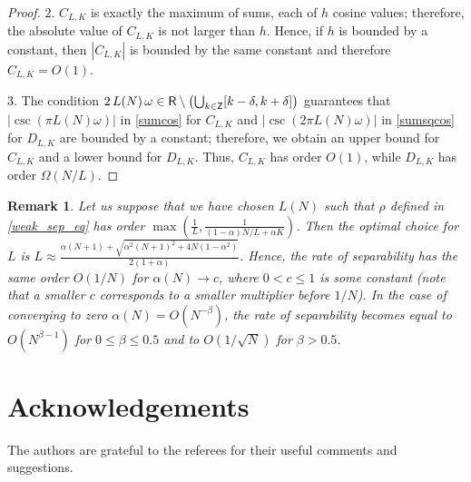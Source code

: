 \documentclass[sii]{ipart}
\newtheorem{remark}{Remark}
\begin{document}
\begin{proof}
    2. $C_{L,K}$ is exactly the maximum of sums, each of $h$ cosine values; therefore, the absolute value of $C_{L,K}$ is not larger than $h$. Hence, if $h$ is bounded by a constant, then $|C_{L,K}|$ is bounded by the same constant and therefore $C_{L,K} = O(1)$.

    3. The condition $2\, L(N)\, \omega \in  \mathsf{R} \setminus \left(\bigcup_{k \in \mathsf{Z}} [k - \delta, k + \delta] \right)$ guarantees that  $|\csc(\pi L(N) \omega)|$ in \eqref{sumcos} for $C_{L,K}$ and $|\csc(2 \pi L(N) \omega)|$ in \eqref{sumsqcos} for $D_{L,K}$ are bounded by a constant; therefore, we obtain an upper bound for $C_{L,K}$ and a lower bound for $D_{L,K}$. Thus, $C_{L, K}$ has order $O(1)$, while $D_{L, K}$ has order $\Omega(N/L)$.
\end{proof}

\begin{remark}
	Let us suppose that we have chosen $L(N)$ such that $\rho$ defined in \eqref{weak_sep_eq} has order $\max\left(\frac{1}{L}, \frac{1}{(1-\alpha)N/L+\alpha K}\right)$. Then the optimal choice for $L$ is $L \approx \frac{\alpha(N + 1) + \sqrt{\alpha^2(N+1)^2 + 4N(1  - \alpha^2)}}{2(1 + \alpha)}$.
Hence, the rate of separability has the same order $O(1/N)$  for $\alpha(N) \to c$, where $0<c\le 1$ is some constant (note that a smaller $c$ corresponds to a smaller multiplier before $1/N$). In the case of converging to zero $\alpha(N) = O(N^{-\beta})$, the rate of separability becomes equal to $O(N^{\beta - 1})$ for $0 \le \beta \le 0.5$ and to $O(1/\sqrt{N})$ for $\beta > 0.5$.
\end{remark}

\section*{Acknowledgements}
The authors are grateful to the referees for their useful comments and suggestions.

\ 



\end{document}
